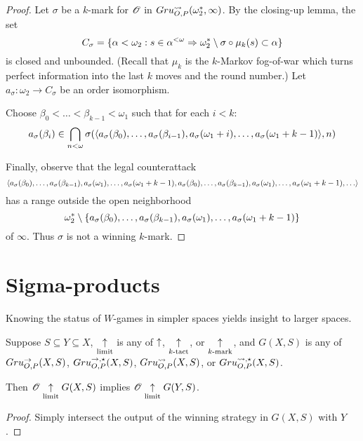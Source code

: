 \begin{proof}
  Let $\sigma$ be a $k$-mark for $\mathscr{O}$ in
  $Gru_{O,P}^{\leadsto}(\omega^*_2,\infty)$. By the closing-up lemma, the set
    \[
      C_\sigma
        =
      \{
        \alpha<\omega_2
          :
        s\in\alpha^{<\omega}
          \Rightarrow
        \omega^*_2\setminus\sigma\circ\mu_k(s)
        \subset \alpha
      \}
    \]
  is closed and unbounded. (Recall that $\mu_k$ is the
  $k$-Markov fog-of-war which turns perfect information into the last $k$
  moves and the round number.) Let $a_\sigma:\omega_2\to C_\sigma$ be
  an order isomorphism.

  Choose $\beta_0<\dots<\beta_{k-1}<\omega_1$ such that for each $i<k$:
    \[
      a_\sigma(\beta_i)
        \in
      \bigcap_{n<\omega}
      \sigma(
        \langle a_\sigma(\beta_0),\dots,a_\sigma(\beta_{i-1}),
          a_\sigma(\omega_1+i),\dots,a_\sigma(\omega_1+k-1)\rangle,
      n)
    \]

  Finally, observe that the legal counterattack
    \[
      \<a_\sigma(\beta_0),\dots,a_\sigma(\beta_{k-1}),
        a_\sigma(\omega_1),\dots,a_\sigma(\omega_1+k-1),
        a_\sigma(\beta_0),\dots,a_\sigma(\beta_{k-1}),
        a_\sigma(\omega_1),\dots,a_\sigma(\omega_1+k-1),
        \dots\>
    \]
  has a range outside the open neighborhood %
    \[
      \omega^*_2
        \setminus
      \{a_\sigma(\beta_0),\dots,a_\sigma(\beta_{k-1}),
        a_\sigma(\omega_1),\dots,a_\sigma(\omega_1+k-1)\}
    \]
  of $\infty$. Thus $\sigma$ is not a winning $k$-mark.
\end{proof}



\section{Sigma-products}

Knowing the status of $W$-games in simpler spaces yields insight to larger
spaces.

\begin{prop}
  Suppose $S\subseteq Y\subseteq X$, $\underset{\text{limit}}{\uparrow}$ is any of $\uparrow$,
  $\underset{k\text{-tact}}{\uparrow}$, or $\underset{k\text{-mark}}{\uparrow}$, and $G(X,S)$ is any of $Gru_{O,P}^{\to}(X,S)$,
  $Gru_{O,P}^{\to,\star}(X,S)$, $Gru_{O,P}^{\leadsto}(X,S)$, or $Gru_{O,P}^{\leadsto,\star}(X,S)$.

  Then $\mathscr{O} \underset{\text{limit}}{\uparrow} G(X,S)$ implies $\mathscr{O} \underset{\text{limit}}{\uparrow} G(Y,S)$.
\end{prop}

\begin{proof}
  Simply intersect the output of the winning strategy in $G(X,S)$ with $Y$.
\end{proof}

